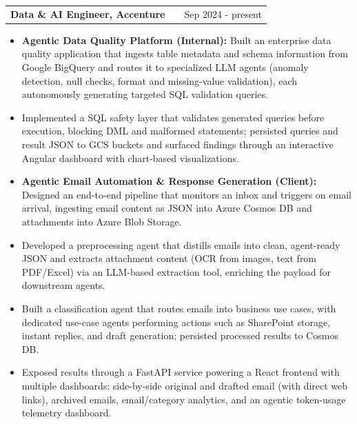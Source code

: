 \documentclass[a4paper,10pt]{article}
\makeatletter
\newenvironment{jobshort}[2]{
    \begin{tabularx}{\linewidth}{@{}l X r@{}}
        \textbf{#1} & \hfill & #2 \\[3.75pt]
    \end{tabularx}
}{
}
\newenvironment{joblong}[2]{
    \begin{tabularx}{\linewidth}{@{}l X r@{}}
        \textbf{#1} & \hfill & #2 \\[3.75pt]
    \end{tabularx}
    \begin{minipage}[t]{\linewidth}
    \begin{itemize}[nosep,after=\strut,leftmargin=1em,itemsep=3pt,label=--]
}{
    \end{itemize}
    \end{minipage}
}
\makeatother
\begin{document}
%

\begin{joblong}{Data \& AI Engineer, Accenture}{Sep 2024 - present}
    \item \textbf{Agentic Data Quality Platform (Internal):} Built an enterprise data quality application that ingests table metadata and schema information from Google BigQuery and routes it to specialized LLM agents (anomaly detection, null checks, format and missing-value validation), each autonomously generating targeted SQL validation queries.
    \item Implemented a SQL safety layer that validates generated queries before execution, blocking DML and malformed statements; persisted queries and result JSON to GCS buckets and surfaced findings through an interactive Angular dashboard with chart-based visualizations.
    \item \textbf{Agentic Email Automation \& Response Generation (Client):} Designed an end-to-end pipeline that monitors an inbox and triggers on email arrival, ingesting email content as JSON into Azure Cosmos DB and attachments into Azure Blob Storage.
    \item Developed a preprocessing agent that distills emails into clean, agent-ready JSON and extracts attachment content (OCR from images, text from PDF/Excel) via an LLM-based extraction tool, enriching the payload for downstream agents.
    \item Built a classification agent that routes emails into business use cases, with dedicated use-case agents performing actions such as SharePoint storage, instant replies, and draft generation; persisted processed results to Cosmos DB.
    \item Exposed results through a FastAPI service powering a React frontend with multiple dashboards: side-by-side original and drafted email (with direct web links), archived emails, email/category analytics, and an agentic token-usage telemetry dashboard.
\end{joblong}
\end{document}
